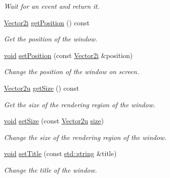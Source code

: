 \begin{DoxyCompactItemize}
\begin{DoxyCompactList}\small\item\em Wait for an event and return it. \end{DoxyCompactList}\item 
\hyperlink{namespacesf_ace09dd1447d74c6e9ba56ae874c094e1}{Vector2i} \hyperlink{classsf_1_1_window_a2e6bc12612ea289afea8268fe37c8678}{get\-Position} () const 
\begin{DoxyCompactList}\small\item\em Get the position of the window. \end{DoxyCompactList}\item 
\hyperlink{glutf90_8h_ac778d6f63f1aaf8ebda0ce6ac821b56e}{void} \hyperlink{classsf_1_1_window_a6c4078bfbf61c29bfc4b4732ce764f17}{set\-Position} (const \hyperlink{namespacesf_ace09dd1447d74c6e9ba56ae874c094e1}{Vector2i} \&position)
\begin{DoxyCompactList}\small\item\em Change the position of the window on screen. \end{DoxyCompactList}\item 
\hyperlink{namespacesf_aaa02ba42bf79b001a376fe9d79254cb3}{Vector2u} \hyperlink{classsf_1_1_window_ad2b55a731ba1680fe67292991ef1610e}{get\-Size} () const 
\begin{DoxyCompactList}\small\item\em Get the size of the rendering region of the window. \end{DoxyCompactList}\item 
\hyperlink{glutf90_8h_ac778d6f63f1aaf8ebda0ce6ac821b56e}{void} \hyperlink{classsf_1_1_window_ad6513418bb2963347cd1819a1810524d}{set\-Size} (const \hyperlink{namespacesf_aaa02ba42bf79b001a376fe9d79254cb3}{Vector2u} \hyperlink{gl3_8h_a79ef9eb3e59c4bb34c4b9fbeb8d28ff7}{size})
\begin{DoxyCompactList}\small\item\em Change the size of the rendering region of the window. \end{DoxyCompactList}\item 
\hyperlink{glutf90_8h_ac778d6f63f1aaf8ebda0ce6ac821b56e}{void} \hyperlink{classsf_1_1_window_a7f419f99a799424376aba838abfbd273}{set\-Title} (const \hyperlink{gl3_8h_ac83513893df92266f79a515488701770}{std\-::string} \&title)
\begin{DoxyCompactList}\small\item\em Change the title of the window. \end{DoxyCompactList}\item 

\end{DoxyCompactItemize}
